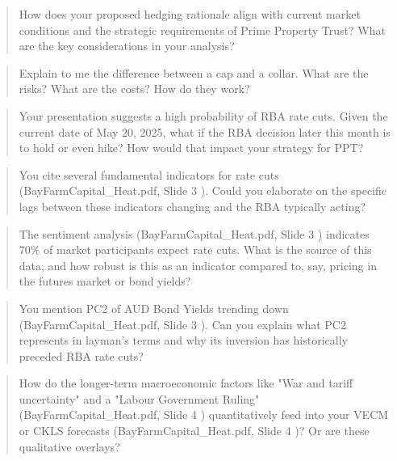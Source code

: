 \documentclass[11pt, a4paper, british]{article}
\begin{document}
\newpage

\begin{quote}
    How does your proposed hedging rationale align with current market conditions and the strategic requirements of Prime Property Trust? What are the key considerations in your analysis?
\end{quote}

\newpage

\begin{quote}
    Explain to me the difference between a cap and a collar. What are the risks? What are the costs? How do they work?
\end{quote}

\begin{quote}
    Your presentation suggests a high probability of RBA rate cuts. Given the current date of May 20, 2025, what if the RBA decision later this month is to hold or even hike? How would that impact your strategy for PPT?
\end{quote}

\begin{quote}
    You cite several fundamental indicators for rate cuts (BayFarmCapital_Heat.pdf, Slide 3 ). Could you elaborate on the specific lags between these indicators changing and the RBA typically acting?
\end{quote}

\begin{quote}
    The sentiment analysis (BayFarmCapital_Heat.pdf, Slide 3 ) indicates 70\% of market participants expect rate cuts. What is the source of this data, and how robust is this as an indicator compared to, say, pricing in the futures market or bond yields?
\end{quote}

\begin{quote}
    You mention PC2 of AUD Bond Yields trending down (BayFarmCapital_Heat.pdf, Slide 3 ). Can you explain what PC2 represents in layman's terms and why its inversion has historically preceded RBA rate cuts?
\end{quote}

\begin{quote}
    How do the longer-term macroeconomic factors like "War and tariff uncertainty" and a "Labour Government Ruling" (BayFarmCapital_Heat.pdf, Slide 4 ) quantitatively feed into your VECM or CKLS forecasts (BayFarmCapital_Heat.pdf, Slide 4 )? Or are these qualitative overlays?
\end{quote}
\end{document}
